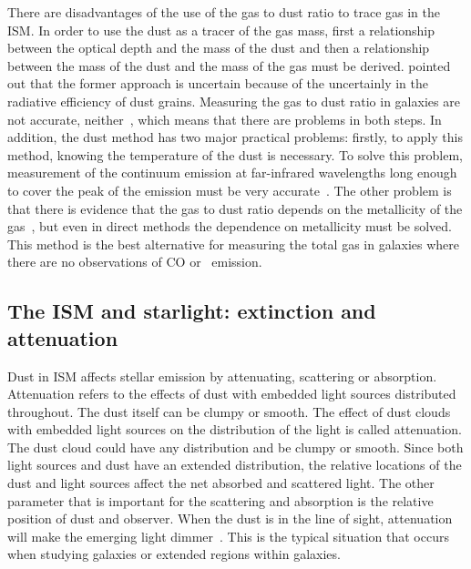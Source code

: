 There are disadvantages of the use of the gas to dust ratio to trace gas in the ISM.
In order to use the dust as a tracer of the gas mass, first a relationship between the optical depth and the mass of the dust and then a relationship between the mass of the dust and the mass of the gas must be derived.
\cite{Draine03} pointed out that the former approach is uncertain because of the uncertainly in the radiative efficiency of dust grains. 
Measuring the gas to dust ratio in galaxies are not accurate, neither~\citep{Hildebran83}, which means that there are problems in both steps. 
In addition, the dust method has two major practical problems: firstly, to apply this method, knowing the temperature of the dust is necessary. 
To solve this problem, measurement of the continuum emission at far-infrared wavelengths long enough to cover the peak of the emission must be very accurate~\citep{Ealas12}. 
The other problem is that there is evidence that the gas to dust ratio depends on the metallicity of the gas~\citep{Lisenfeld98, Draine07}, but even in direct methods the dependence on metallicity must be solved. 
This method is the best alternative for measuring the total gas in galaxies where there are no observations of CO or \hi~emission. 

\subsection{The ISM and starlight: extinction and attenuation}
\label{sec: extinction}
Dust in ISM affects stellar emission by attenuating, scattering or absorption.
Attenuation refers to the effects of dust with embedded light sources distributed throughout. 
The dust itself can be clumpy or smooth. 
The effect of dust clouds with embedded light sources on the distribution of the light is called attenuation.
The dust cloud could have any distribution and be clumpy or smooth.
Since both light sources and dust have an extended distribution, the relative locations of the dust and light sources affect the net absorbed and scattered light.
The other parameter that is important for the scattering and absorption is the relative position of dust and observer.
When the dust is in the line of sight, attenuation will make the emerging light dimmer~\citep[e.g.][and references therein]{Calzetti13}.
This is the typical situation that occurs when studying galaxies or extended regions within galaxies.

